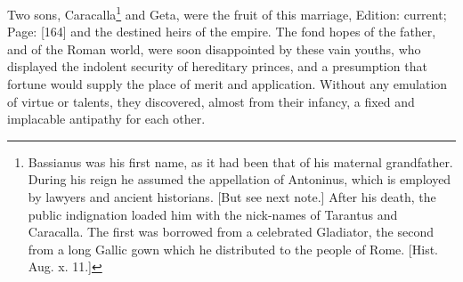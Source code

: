 Two sons, Caracalla\footnote{Bassianus was his first name, as it had been that of his maternal grandfather. During his reign he assumed the appellation of Antoninus, which is employed by lawyers and ancient historians. [But see next note.] After his death, the public indignation loaded him with the nick-names of Tarantus and Caracalla. The first was borrowed from a celebrated Gladiator, the second from a long Gallic gown which he distributed to the people of Rome. [Hist. Aug. x. 11.]} and Geta, were the fruit of this marriage, Edition: current; Page: [164] and the destined heirs of the empire. The fond hopes of the father, and of the Roman world, were soon disappointed by these vain youths, who displayed the indolent security of hereditary princes, and a presumption that fortune would supply the place of merit and application. Without any emulation of virtue or talents, they discovered, almost from their infancy, a fixed and implacable antipathy for each other.


